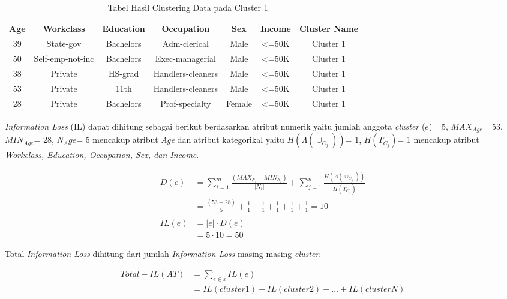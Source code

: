 \begin{table}[H]
\centering
\caption{Tabel Hasil Clustering Data pada Cluster 1}
\begin{tabular}{c c c c c c c c}
\hline 
Age & Workclass & Education & Occupation & Sex & Income & Cluster Name \\ 
\hline 
39 & State-gov & Bachelors & Adm-clerical & Male & <=50K & Cluster 1 \\ 
50 & Self-emp-not-inc & Bachelors & Exec-managerial & Male & <=50K & Cluster 1 \\ 
38 & Private & HS-grad & Handlers-cleaners & Male & <=50K & Cluster 1 \\ 
53 & Private & 11th & Handlers-cleaners & Male & <=50K & Cluster 1 \\ 
28 & Private & Bachelors & Prof-specialty & Female & <=50K & Cluster 1 \\ 
\hline 
\end{tabular} 
\label{table:informationloss}
\end{table}

\noindent \textit{Information Loss} (IL) dapat dihitung sebagai berikut berdasarkan atribut numerik yaitu jumlah anggota \textit{cluster} ($e$)= 5, $MAX_{Age}$= 53, $MIN_{Age}$= 28, $N_Age$= 5 mencakup atribut \textit{Age} dan atribut kategorikal yaitu $H(\Lambda(\cup_{C_j}))$= 1, $H(T_{C_j})$= 1 mencakup atribut \textit{Workclass, Education, Occupation, Sex, dan Income}.

\begin{align*}
D(e) &= \sum_{i=1}^{m} \frac{(MAX_{N_i} - MIN_{N_i})}{|N_i|} + \sum_{j=1}^{n}\frac{H(\Lambda(\cup_{C_j}))}{H(T_{C_j})}\\
&= \frac{(53 - 28)}{5} + \frac{1}{1}+\frac{1}{1}+\frac{1}{1}+\frac{1}{1}+\frac{1}{1} = 10\\\\
IL(e) &= |e| \cdot D(e)\\
&= 5 \cdot 10 = 50
\end{align*}

\noindent Total \textit{Information Loss} dihitung dari jumlah \textit{Information Loss} masing-masing \textit{cluster}.

\begin{align*}
Total-IL(AT) &= \sum_{e \in \varepsilon}^{}  IL(e)\\
&= IL(cluster1)+IL(cluster2)+\ldots+IL(clusterN)
\end{align*}

